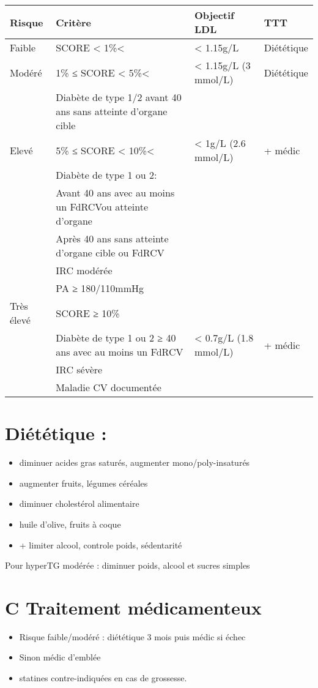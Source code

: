 \documentclass[11pt]{article}
\begin{document}
\begin{center}
\begin{tabular}{llll}
Risque & Critère & Objectif LDL & TTT\\
\hline
Faible & SCORE < 1\%< & < 1.15g/L & Diététique\\
\hline
Modéré & 1\% ≤ SCORE < 5\%< & < 1.15g/L (3 mmol/L) & Diététique\\
 & Diabète de type 1/2 avant 40 ans sans atteinte d’organe cible &  & \\
\hline
Elevé & 5\% ≤ SCORE < 10\%< & < 1g/L (2.6 mmol/L) & + médic\\
 & Diabète de type 1 ou 2: &  & \\
 & Avant 40 ans avec au moins un FdRCVou atteinte d’organe &  & \\
 & Après 40 ans sans atteinte d’organe cible ou FdRCV &  & \\
 & IRC modérée &  & \\
 & PA ≥ 180/110mmHg &  & \\
\hline
Très élevé & SCORE ≥ 10\% &  & \\
 & Diabète de type 1 ou 2 ≥ 40 ans avec au moins un FdRCV & < 0.7g/L (1.8 mmol/L) & + médic\\
 & IRC sévère &  & \\
 & Maladie CV documentée &  & \\
\end{tabular}
\end{center}

\section{Diététique :}
\label{sec:orgfc6fdd5}
\begin{itemize}
\item diminuer acides gras saturés, augmenter mono/poly-insaturés
\item augmenter fruits, légumes céréales
\item diminuer cholestérol alimentaire
\item huile d'olive, fruits à coque
\item + limiter alcool, controle poids, sédentarité
\end{itemize}

Pour hyperTG modérée : diminuer poids, alcool et sucres simples

\section{C Traitement médicamenteux}
\label{sec:orgdd4964a}
\begin{itemize}
\item Risque faible/modéré : diététique 3 mois puis médic si échec
\item Sinon médic d'emblée
\item statines contre-indiquées en cas de grossesse.
\end{itemize}
\end{document}
